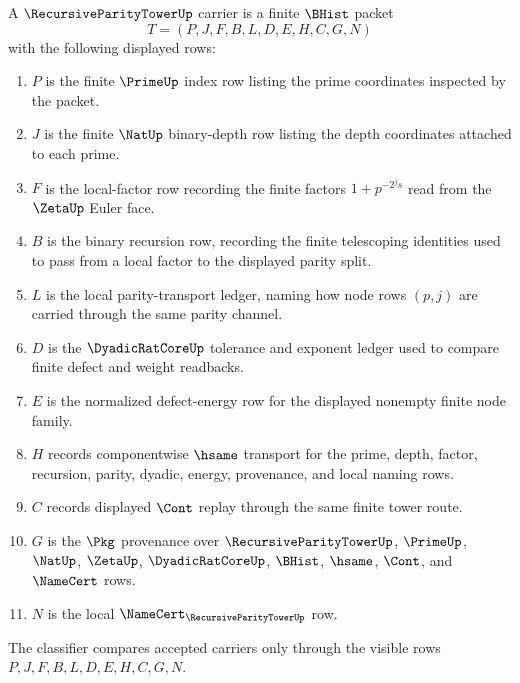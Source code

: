 \begin{definition}
\label{def:recursive-parity-tower-carrier}
A $\RecursiveParityTowerUp$ carrier is a finite $\BHist$ packet
$$
T=(P,J,F,B,L,D,E,H,C,G,N)
$$
with the following displayed rows:
\begin{enumerate}
\item $P$ is the finite $\PrimeUp$ index row listing the prime coordinates inspected by the packet.
\item $J$ is the finite $\NatUp$ binary-depth row listing the depth coordinates attached to each prime.
\item $F$ is the local-factor row recording the finite factors $1+p^{-2^j s}$ read from the $\ZetaUp$ Euler face.
\item $B$ is the binary recursion row, recording the finite telescoping identities used to pass from a local factor to the displayed parity split.
\item $L$ is the local parity-transport ledger, naming how node rows $(p,j)$ are carried through the same parity channel.
\item $D$ is the $\DyadicRatCoreUp$ tolerance and exponent ledger used to compare finite defect and weight readbacks.
\item $E$ is the normalized defect-energy row for the displayed nonempty finite node family.
\item $H$ records componentwise $\hsame$ transport for the prime, depth, factor, recursion, parity, dyadic, energy, provenance, and local naming rows.
\item $C$ records displayed $\Cont$ replay through the same finite tower route.
\item $G$ is the $\Pkg$ provenance over $\RecursiveParityTowerUp$, $\PrimeUp$, $\NatUp$, $\ZetaUp$, $\DyadicRatCoreUp$, $\BHist$, $\hsame$, $\Cont$, and $\NameCert$ rows.
\item $N$ is the local $\NameCert_{\RecursiveParityTowerUp}$ row.
\end{enumerate}
The classifier compares accepted carriers only through the visible rows $P,J,F,B,L,D,E,H,C,G,N$.
\end{definition}

